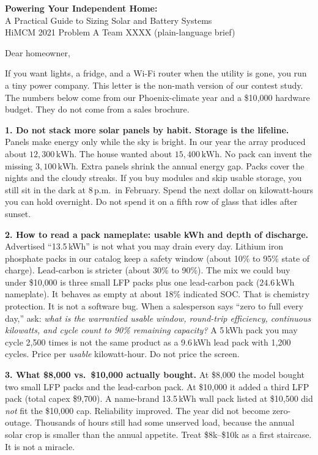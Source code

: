 \documentclass[11pt]{letter}
\begin{document}
\begin{center}
{\Large\bfseries Powering Your Independent Home:}\\[0.2em]
{\large A Practical Guide to Sizing Solar and Battery Systems}\\[0.45em]
{\normalsize HiMCM 2021 Problem A \quad Team XXXX \quad (plain-language brief)}
\end{center}
\vspace{0.6em}

\noindent
Dear homeowner,

\noindent
If you want lights, a fridge, and a Wi-Fi router when the utility is
gone, you run a tiny power company. This letter is the non-math version
of our contest study. The numbers below come from our Phoenix-climate
year and a \$10{,}000 hardware budget. They do not come from a sales
brochure.

\medskip
\noindent\textbf{1. Do not stack more solar panels by habit. Storage is
the lifeline.}
Panels make energy only while the sky is bright. In our year the array
produced about \(12{,}300\,\mathrm{kWh}\). The house wanted about
\(15{,}400\,\mathrm{kWh}\). No pack can invent the missing
\(3{,}100\,\mathrm{kWh}\). Extra panels shrink the annual energy gap.
Packs cover the nights and the cloudy streaks. If you buy modules and
skip usable storage, you still sit in the dark at 8\,p.m.\ in February.
Spend the next dollar on kilowatt-hours you can hold overnight. Do not
spend it on a fifth row of glass that idles after sunset.

\medskip
\noindent\textbf{2. How to read a pack nameplate: usable kWh and
depth of discharge.}
Advertised ``13.5\,kWh'' is not what you may drain every day. Lithium
iron phosphate packs in our catalog keep a safety window (about 10\% to
95\% state of charge). Lead-carbon is stricter (about 30\% to 90\%).
The mix we could buy under \$10{,}000 is three small LFP packs plus one
lead-carbon pack (\(24.6\,\mathrm{kWh}\) nameplate). It behaves as empty
at about 18\% indicated SOC. That is chemistry protection. It is not a
software bug. When a salesperson says ``zero to full every day,'' ask:
\emph{what is the warrantied usable window, round-trip efficiency,
continuous kilowatts, and cycle count to 90\% remaining capacity?}
A 5\,kWh pack you may cycle 2{,}500 times is not the same product as a
9.6\,kWh lead pack with 1{,}200 cycles. Price per \emph{usable}
kilowatt-hour. Do not price the screen.

\medskip
\noindent\textbf{3. What \$8{,}000 vs.\ \$10{,}000 actually bought.}
At \$8{,}000 the model bought two small LFP packs and the lead-carbon
pack. At \$10{,}000 it added a third LFP pack (total capex \$9{,}700).
A name-brand 13.5\,kWh wall pack listed at \$10{,}500 did \emph{not}
fit the \$10{,}000 cap. Reliability improved. The year did not become
zero-outage. Thousands of hours still had some unserved load, because
the annual solar crop is smaller than the annual appetite. Treat
\$8k--\$10k as a first staircase. It is not a miracle.
\end{document}

